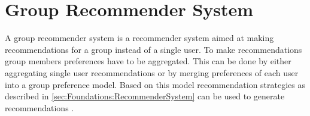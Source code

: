 \section{Group Recommender System}

A group recommender system is a recommender system aimed at making recommendations for a group instead of a single user. To make recommendations group members preferences have to be aggregated. This can be done by either aggregating single user recommendations or by merging preferences of each user into a group preference model. Based on this model recommendation strategies as described in \autoref{sec:Foundations:RecommenderSystem} can be used to generate recommendations \cite{jamesonRecommendationGroups2007}.

\FloatBarrier
